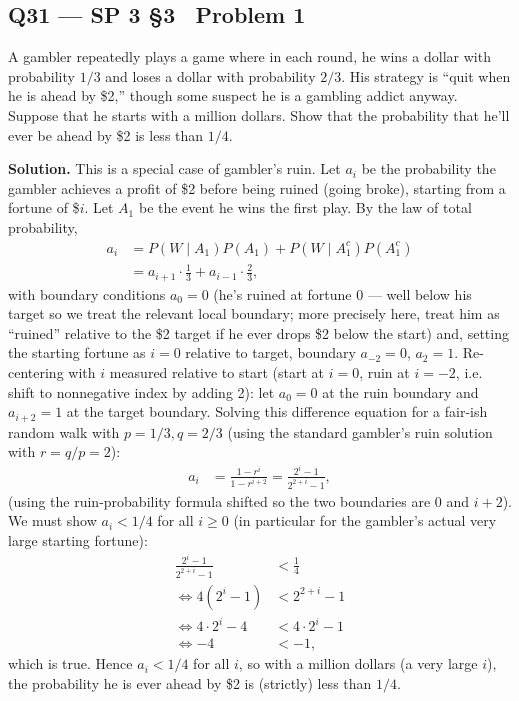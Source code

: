 \documentclass[11pt]{article}
\begin{document}
\subsection*{Q31 --- SP 3 \S3 \textperiodcentered\ Problem 1}
\begin{qbox}
A gambler repeatedly plays a game where in each round, he wins a dollar with probability $1/3$ and loses a dollar with probability $2/3$. His strategy is ``quit when he is ahead by \$2,'' though some suspect he is a gambling addict anyway. Suppose that he starts with a million dollars. Show that the probability that he'll ever be ahead by \$2 is less than $1/4$.
\end{qbox}
\textbf{Solution.} This is a special case of gambler's ruin. Let $a_i$ be the probability the gambler achieves a profit of \$2 before being ruined (going broke), starting from a fortune of \$$i$. Let $A_1$ be the event he wins the first play. By the law of total probability,
\begin{align*}
a_i &= P(W\mid A_1)P(A_1) + P(W\mid A_1^c)P(A_1^c) \\
&= a_{i+1}\cdot\frac13 + a_{i-1}\cdot\frac23,
\end{align*}
with boundary conditions $a_0 = 0$ (he's ruined at fortune 0 — well below his target so we treat the relevant local boundary; more precisely here, treat him as ``ruined'' relative to the \$2 target if he ever drops \$2 below the start) and, setting the starting fortune as $i=0$ relative to target, boundary $a_{-2}=0$, $a_{2}=1$. Re-centering with $i$ measured relative to start (start at $i=0$, ruin at $i=-2$, i.e. shift to nonnegative index by adding 2): let $a_0=0$ at the ruin boundary and $a_{i+2}=1$ at the target boundary. Solving this difference equation for a fair-ish random walk with $p=1/3, q=2/3$ (using the standard gambler's ruin solution with $r=q/p=2$):
\begin{align*}
a_i &= \frac{1-r^{i}}{1-r^{i+2}} = \frac{2^i-1}{2^{2+i}-1},
\end{align*}
(using the ruin-probability formula shifted so the two boundaries are $0$ and $i+2$). We must show $a_i < 1/4$ for all $i \ge 0$ (in particular for the gambler's actual very large starting fortune):
\begin{align*}
\frac{2^i - 1}{2^{2+i}-1} &< \frac14 \\
\iff 4(2^i-1) &< 2^{2+i}-1 \\
\iff 4\cdot 2^i - 4 &< 4\cdot 2^i - 1 \\
\iff -4 &< -1,
\end{align*}
which is true. Hence $a_i < 1/4$ for all $i$, so with a million dollars (a very large $i$), the probability he is ever ahead by \$2 is (strictly) less than $1/4$.
\end{document}
